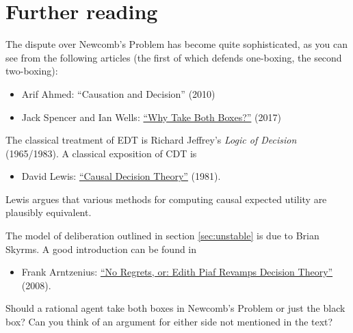 \section{Further reading}

The dispute over Newcomb's Problem has become quite sophisticated, as
you can see from the following articles (the first of which defends
one-boxing, the second two-boxing):

\begin{itemize}
\item Arif Ahmed: ``Causation and Decision'' (2010)
\item Jack Spencer and Ian Wells: \href{http://web.mit.edu/ianwells/www/WhyTakeBothBoxes.pdf}{``Why Take Both Boxes?''} (2017)
\end{itemize}

The classical treatment of EDT is Richard Jeffrey's \emph{Logic of
  Decision} (1965/1983). A classical exposition of CDT is
\begin{itemize}
\item David Lewis: \href{http://www.andrewmbailey.com/dkl/Causal_Decision_Theory.pdf}{``Causal Decision Theory''} (1981).
\end{itemize}
Lewis argues that various methods for computing causal expected
utility are plausibly equivalent.

The model of deliberation outlined in section \ref{sec:unstable} is
due to Brian Skyrms. A good introduction can be found in
\begin{itemize}
\item Frank Arntzenius: \href{https://57854434-a-62cb3a1a-s-sites.googlegroups.com/site/easwaran/readings/Arntzenius08.pdf?attachauth=ANoY7crVEwFQQqEi2qaTYEHCGkbpO7qAojrYZZoXo0j0xuI76_qOkWaKZvbySj_4A0QeixdNPVU8Gs1iA2UeS58tXWSPMAwN3Kqr2Wnr1KfNVCw1z-A5qTIJ54Ltb3gTmqcO-xHmdQOxDw0FCa7aSB63PrADPQq36qxA2N-4XkJXg3DHWS3V_hqlMRlNs8Cks6Rnb47vvsp3OtYG5Z8azK1bDotPUCMdjNmp_t4q1qSoEOMHE1vPh08\%3D\&attredirects=0}{``No Regrets, or: Edith Piaf Revamps Decision Theory''} (2008).
\end{itemize}


\begin{essay}
  Should a rational agent take both boxes in Newcomb's Problem or just
  the black box? Can you think of an argument for either side not
  mentioned in the text?
\end{essay}


